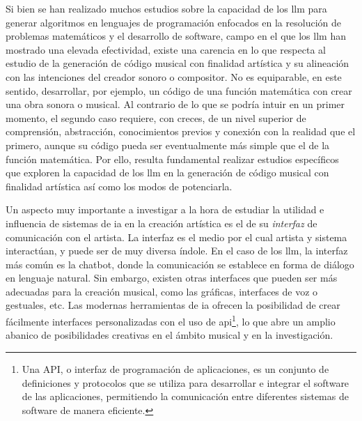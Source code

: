 Si bien se han realizado muchos estudios sobre la capacidad de los \gls{llm} para generar algoritmos en lenguajes de programación enfocados en la resolución de problemas matemáticos y el desarrollo de {software}, campo en el que los \gls{llm} han mostrado una elevada efectividad, existe una carencia en lo que respecta al estudio de la generación de código musical con finalidad artística y su alineación con las intenciones del creador sonoro o compositor. No es equiparable, en este sentido, desarrollar, por ejemplo, un código de una función matemática con crear una obra sonora o musical. Al contrario de lo que se podría intuir en un primer momento, el segundo caso requiere, con creces, de un nivel superior de comprensión, abstracción, conocimientos previos y conexión con la realidad que el primero, aunque su código pueda ser eventualmente más simple que el de la función matemática. Por ello, resulta fundamental realizar estudios específicos que exploren la capacidad de los \gls{llm} en la generación de código musical con finalidad artística así como los modos de potenciarla.

Un aspecto muy importante a investigar a la hora de estudiar la utilidad e influencia de sistemas de \gls{ia} en la creación artística es el de su \emph{interfaz} de comunicación con el artista. La interfaz es el medio por el cual artista y sistema interactúan, y puede ser de muy diversa índole. En el caso de los \gls{llm}, la interfaz más común es la {chatbot}, donde la comunicación se establece en forma de diálogo en lenguaje natural. Sin embargo, existen otras interfaces que pueden ser más adecuadas para la creación musical, como las gráficas, interfaces de voz o gestuales, etc. Las modernas herramientas de \gls{ia} ofrecen la posibilidad de crear fácilmente interfaces personalizadas con el uso de \gls{api}\footnote{Una API, o interfaz de programación de aplicaciones, es un conjunto de definiciones y protocolos que se utiliza para desarrollar e integrar el software de las aplicaciones, permitiendo la comunicación entre diferentes sistemas de software de manera eficiente\citep{WikipediaAPI}.}, lo que abre un amplio abanico de posibilidades creativas en el ámbito musical y en la investigación.

